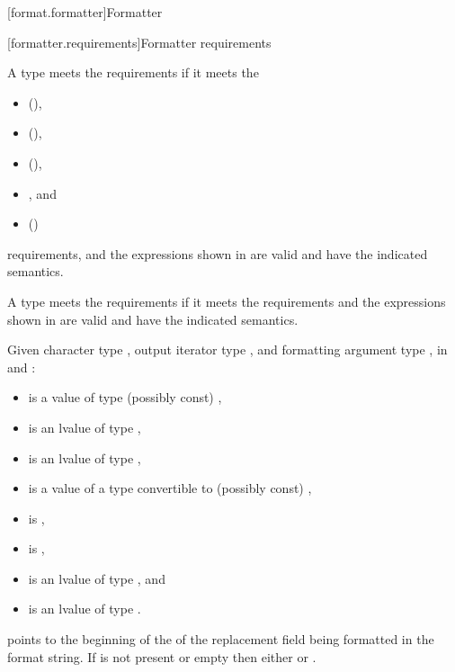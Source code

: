 [format.formatter]{Formatter}

[formatter.requirements]{Formatter requirements}

\pnum
A type  meets the  requirements if
it meets the
\begin{itemize}
\item {} (),
\item {} (),
\item {} (),
\item {}, and
\item {} ()
\end{itemize}
requirements, and
the expressions shown in  are valid and
have the indicated semantics.

\pnum
A type  meets the  requirements
if it meets the  requirements and
the expressions shown in  are valid and
have the indicated semantics.

\pnum
Given character type , output iterator type
, and formatting argument type ,
in  and :
\begin{itemize}
\item {} is a value of type (possibly const) ,
\item {} is an lvalue of type ,
\item {} is an lvalue of type ,
\item {} is a value of a type convertible to (possibly const) ,
\item {} is ,
\item {} is ,
\item {} is an lvalue of type , and
\item {} is an lvalue of type .
\end{itemize}
 points to the beginning of the
of the replacement field being formatted
in the format string.
If  is not present or empty then either
 or
.

